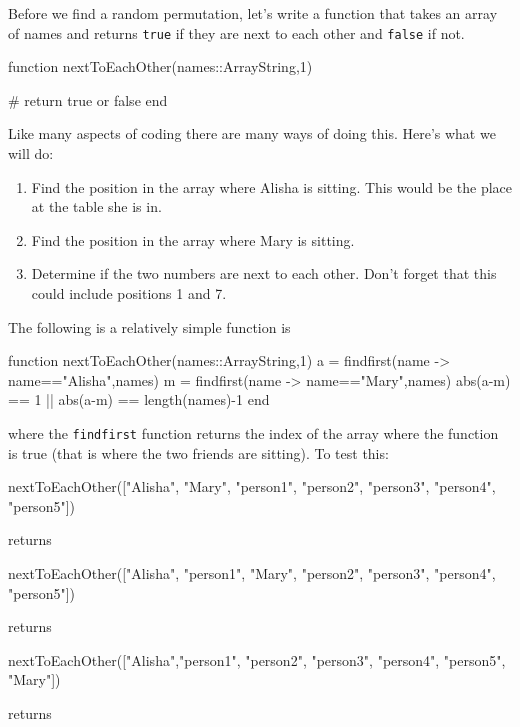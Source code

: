 Before we find a random permutation, let's write a function that takes an array of names and returns \verb!true! if they are next to each other and \verb!false! if not. 

\begin{jlblock}[prob]
function nextToEachOther(names::Array{String,1})

# return true or false
end
\end{jlblock}

Like many aspects of coding there are many ways of doing this.  Here's what we will do:

\begin{enumerate}
\item Find the position in the array where Alisha is sitting.  This would be the place at the table she is in.
\item Find the position in the array where Mary is sitting. 
\item Determine if the two numbers are next to each other.  Don't forget that this could include positions 1 and 7. 
\end{enumerate}

The following is a relatively simple function is
\begin{jlblock}[prob]
function nextToEachOther(names::Array{String,1})
  a = findfirst(name -> name=="Alisha",names)
  m = findfirst(name -> name=="Mary",names)
  abs(a-m) == 1 || abs(a-m) == length(names)-1
end
\end{jlblock}
%
where the \verb!findfirst! function returns the index of the array where the function is true (that is where the two friends are sitting).  To test this:

\begin{jlblock}[prob]
nextToEachOther(["Alisha", "Mary", "person1", "person2", "person3", "person4", "person5"])
\end{jlblock} 
%
returns  \printpythontex

\begin{jlblock}[prob]
nextToEachOther(["Alisha", "person1", "Mary", "person2", "person3", "person4", "person5"])
\end{jlblock}
% 
 returns  \printpythontex

\begin{jlblock}[prob]
nextToEachOther(["Alisha","person1", "person2", "person3", "person4", "person5", "Mary"])
\end{jlblock}
%
 returns  \printpythontex

